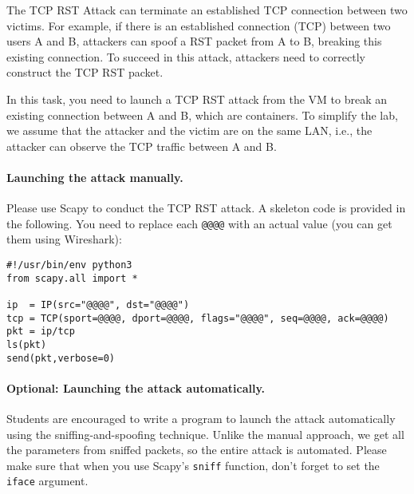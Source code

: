 The TCP RST Attack can terminate an established TCP connection between
two victims. For example, if there is an established \telnet connection (TCP)
between two users A and B, attackers can spoof a RST packet from A to B,
breaking this existing connection. To succeed in this attack, attackers
need to correctly construct the TCP RST packet. 

In this task, you need to launch a TCP RST attack from the VM 
to break an existing \telnet connection between A and B, which are 
containers.  To simplify the lab,
we assume that the attacker and the victim are on the same LAN,
i.e., the attacker can observe the TCP traffic between
A and B.


\paragraph{Launching the attack manually.} 
Please use Scapy to conduct the TCP RST attack. 
A skeleton code is provided in the following. You need to replace each
\texttt{@@@@} with an actual value (you can get them using Wireshark):  


\begin{lstlisting}
#!/usr/bin/env python3
from scapy.all import *

ip  = IP(src="@@@@", dst="@@@@")
tcp = TCP(sport=@@@@, dport=@@@@, flags="@@@@", seq=@@@@, ack=@@@@)
pkt = ip/tcp
ls(pkt)
send(pkt,verbose=0)
\end{lstlisting}

\paragraph{Optional: Launching the attack automatically.} 
Students are encouraged to write a program to launch the 
attack automatically using the sniffing-and-spoofing technique. 
Unlike the manual approach, we get all the parameters
from sniffed packets, so the entire attack is automated.  
Please make sure that when you 
use Scapy's \texttt{sniff} function, don't forget to 
set the \texttt{iface} argument.  

 

